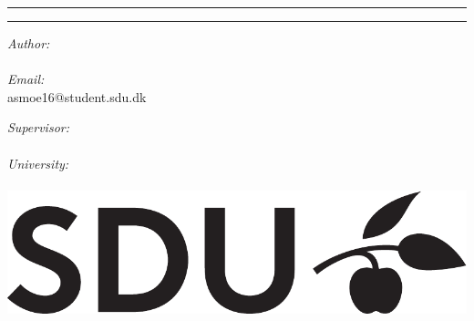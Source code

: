 \documentclass[../main.tex]{subfiles}
\begin{document}
\vspace{3cm}
\hrule
\begin{center}
	{\bf\Huge\Title}
\end{center}
\hrule
\begin{multicols}{2}
	\begin{flushleft}
		\textit{Author:} \\
		\Author\\
		\vspace{10pt}
		\textit{Email:} \\
		asmoe16@student.sdu.dk

	\end{flushleft}
	\columnbreak
	\begin{flushright}
		\textit{Supervisor:} \\
		\Supervisor \\
		\vspace{10pt} 
		\textit{University:}\\
		\University \\
	\includegraphics[width=.4\textwidth]{img/SDU_BLACK_CMYK-eps-converted-to.pdf}
	\end{flushright}
\end{multicols}
\end{document}
